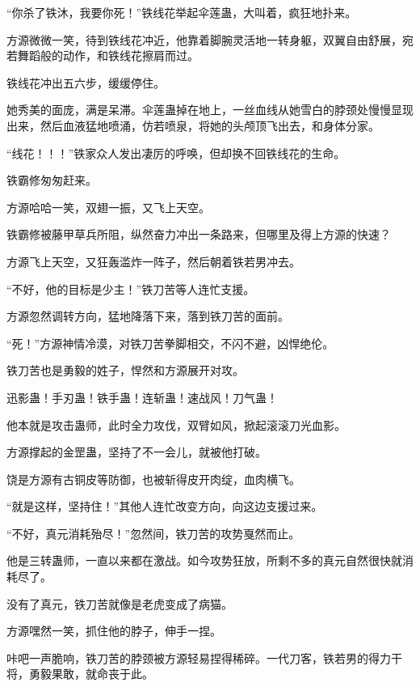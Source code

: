 
\begin{this_body}



“你杀了铁沐，我要你死！”铁线花举起伞莲蛊，大叫着，疯狂地扑来。

方源微微一笑，待到铁线花冲近，他靠着脚腕灵活地一转身躯，双翼自由舒展，宛若舞蹈般的动作，和铁线花擦肩而过。

铁线花冲出五六步，缓缓停住。

她秀美的面庞，满是呆滞。伞莲蛊掉在地上，一丝血线从她雪白的脖颈处慢慢显现出来，然后血液猛地喷涌，仿若喷泉，将她的头颅顶飞出去，和身体分家。

“线花！！！”铁家众人发出凄厉的呼唤，但却换不回铁线花的生命。

铁霸修匆匆赶来。

方源哈哈一笑，双翅一振，又飞上天空。

铁霸修被藤甲草兵所阻，纵然奋力冲出一条路来，但哪里及得上方源的快速？

方源飞上天空，又狂轰滥炸一阵子，然后朝着铁若男冲去。

“不好，他的目标是少主！”铁刀苦等人连忙支援。

方源忽然调转方向，猛地降落下来，落到铁刀苦的面前。

“死！”方源神情冷漠，对铁刀苦拳脚相交，不闪不避，凶悍绝伦。

铁刀苦也是勇毅的姓子，悍然和方源展开对攻。

迅影蛊！手刃蛊！铁手蛊！连斩蛊！速战风！刀气蛊！

他本就是攻击蛊师，此时全力攻伐，双臂如风，掀起滚滚刀光血影。

方源撑起的金罡蛊，坚持了不一会儿，就被他打破。

饶是方源有古铜皮等防御，也被斩得皮开肉绽，血肉横飞。

“就是这样，坚持住！”其他人连忙改变方向，向这边支援过来。

“不好，真元消耗殆尽！”忽然间，铁刀苦的攻势戛然而止。

他是三转蛊师，一直以来都在激战。如今攻势狂放，所剩不多的真元自然很快就消耗尽了。

没有了真元，铁刀苦就像是老虎变成了病猫。

方源嘿然一笑，抓住他的脖子，伸手一捏。

咔吧一声脆响，铁刀苦的脖颈被方源轻易捏得稀碎。一代刀客，铁若男的得力干将，勇毅果敢，就命丧于此。


\end{this_body}
